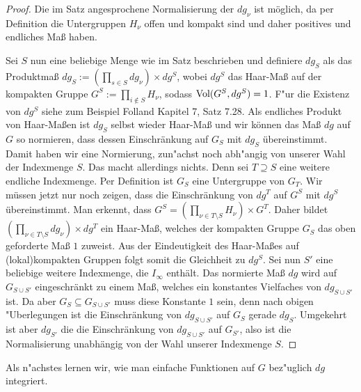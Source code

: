 		\begin{proof}
			Die im Satz angesprochene Normalisierung der $dg_\nu$ ist möglich, da per Definition die Untergruppen $H_\nu$ offen und kompakt sind und daher positives und endliches Maß haben.
			
			Sei $S$ nun eine beliebige Menge wie im Satz beschrieben und definiere $dg_S$ als das Produktmaß $dg_S :=\left(\prod_{s \in S}dg_\nu\right) \times dg^S$, wobei $dg^S$ das Haar-Maß auf der kompakten Gruppe $G^S:=\prod_{i \notin S} H_\nu$, sodass $\text{Vol}(G^S, dg^S) = 1$. 
			F"ur die Existenz von $dg^S$ siehe zum Beispiel Folland \cite{folland} Kapitel 7, Satz 7.28. 
			Als endliches Produkt von Haar-Maßen ist $dg_S$ selbst wieder Haar-Maß und wir können das Maß $dg$ auf $G$ so normieren, dass dessen Einschränkung auf $G_S$ mit $dg_S$ übereinstimmt.
			Damit haben wir eine Normierung, zun"achst noch abh"angig von unserer Wahl der Indexmenge $S$.
			Das macht allerdings nichts.
			Denn sei $T\supseteq S$ eine weitere endliche Indexmenge. 
			Per Definition ist $G_S$ eine Untergruppe von $G_T$. 
			Wir müssen jetzt nur noch zeigen, dass die Einschränkung von $dg^T$ auf $G^S$ mit $dg^S$ übereinstimmt.
			Man erkennt, dass $G^S = \left(\prod_{\nu\in T \setminus S} H_\nu\right) \times G^T$.
			Daher bildet $\left(\prod_{\nu\in T \setminus S} dg_\nu\right) \times dg^T$ ein Haar-Maß, welches der kompakten Gruppe $G_S$ das oben geforderte Maß $1$ zuweist.
			Aus der Eindeutigkeit des Haar-Maßes auf (lokal)kompakten Gruppen folgt somit die Gleichheit zu $dg^S$.
			Sei nun $S'$ eine beliebige weitere Indexmenge, die $I_\infty$ enthält. 
			Das normierte Maß $dg$ wird auf $G_{S\cup S'}$ eingeschränkt zu einem Maß, welches ein konstantes Vielfaches von $dg_{S\cup S'}$ ist. 
			Da aber $G_S \subseteq G_{S\cup S'}$ muss diese Konstante $1$ sein, denn nach obigen "Uberlegungen ist die Einschränkung von $dg_{S\cup S'}$ auf $G_S$ gerade $dg_{S}$.
			Umgekehrt ist aber $dg_{S'}$ die die Einschränkung von $dg_{S\cup S'}$ auf $G_{S'}$, also ist die Normalisierung unabhängig von der Wahl unserer Indexmenge $S$.
		\end{proof}
		Als n"achstes lernen wir, wie man einfache Funktionen auf $G$ bez"uglich $dg$ integriert.
